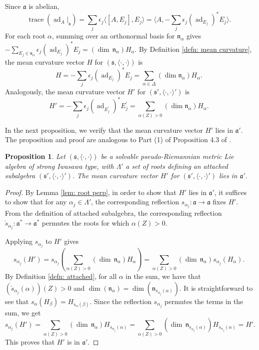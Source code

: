 \documentclass[12pt]{amsart}
\newcommand{\la}{\langle}
\newcommand{\ra}{\rangle}
\newcommand{\fraka}{\ensuremath{\mathfrak{a}} }
\newcommand{\frakn}{\ensuremath{\mathfrak{n}} }
\newcommand{\fraks}{\ensuremath{\mathfrak{s}} }
\renewcommand\a{{\mathfrak{a}}}
\newcommand\n{{\mathfrak{n}}}
\newcommand\s{{\mathfrak{s}}}
\newcommand\ip{{\langle\cdot {,} \cdot\rangle}}
\newcommand\tr{\operatorname{trace}}
\newcommand\ad{\operatorname{ad}}
\theoremstyle{plain}
\newtheorem{prop}[theorem]{Proposition}
\theoremstyle{definition}
\theoremstyle{remark}
\numberwithin{equation}{section}
\numberwithin{theorem}{section}
\begin{document}
Since $\a$ is abelian,
$$ \tr(\ad_A|_{\s}) = \sum_j\epsilon_j \la [A, E_j], E_j \ra   = \la A, -\sum_j  \epsilon_j (\ad_{E_j})^* E_j\ra .$$  
For each root $\alpha$, summing over an orthonormal basis  for 
$\frakn_\alpha$ gives $-\sum_{E_j \in \frakn_\alpha} \epsilon_j (\ad_{E_j})^* E_j  =  (\dim \,\n_\alpha) H_\alpha.$ By Definition \ref{defn: mean curvature},  the mean curvature vector $H$ for $(\fraks,\ip)$  is
\begin{equation}\label{eqn: H}
 H = -\sum_j \epsilon_j (\ad_{E_j})^\ast E_j
 = \sum_{\alpha\in\Delta} (\dim \n_\alpha) H_\alpha .
\end{equation}
Analogously, the  mean curvature vector $H'$ for $(\fraks',\ip')$ is 
\begin{equation}\label{eqn: H'}
 H' = -\sum_j \epsilon_j (\ad_{E_j^\prime})^\ast E_j^\prime
 = \sum_{\alpha(Z)>0} (\dim \n_\alpha) H_\alpha . \end{equation}
 
In the next proposition, we verify that  the mean curvature vector $H'$  
lies in $\fraka'$.  The proposition and proof are analogous to Part (1) of Proposition 
4.3 of \cite{tamaru-11}.
\begin{prop}\label{prop: mean curvature vectors}
Let $(\s,\ip)$ be a solvable pseudo-Riemannian  metric Lie algebra of strong Iwasawa type, with $\Lambda'$ a set of  roots defining an attached subalgebra   $(\s',\ip')$. 
The mean curvature vector $H'$ for $(\fraks',\ip')$ lies in $\a'$.
\end{prop}

\begin{proof}
By Lemma \ref{lem: root perp}, in order to show that $H'$ lies in $\a'$,  it suffices to show that for any  $\alpha_j \in \Lambda'$, the corresponding reflection   $s_{\alpha_j} : \a \to \a$  fixes $H'.$ 
From the definition of attached subalgebra,
the corresponding  reflection  $\check{s}_{\alpha_j} : \a^* \to \a^*$  permutes the roots for which $\alpha(Z) >0$.  

Applying $s_{\alpha_j}$ to $H'$ gives
\[ s_{\alpha_j}(H') = s_{\alpha_j} \left(\sum_{\alpha(Z)>0} (\dim\,\n_\alpha) H_\alpha \right) 
= \sum_{\alpha(Z) >0} (\dim\,\n_\alpha) s_{\alpha_j}(H_\alpha). \]
By  Definition \ref{defn: attached},  for all $\alpha$ in the sum, we have that $(\check{s}_{\alpha_j}(\alpha))(Z) >0$ and $\dim(\n_\alpha) = \dim(\n_{\check{s}_{\alpha_j}(\alpha)})$.  
It is straightforward to see that  $s_{\alpha}(H_\beta)=H_{\check{s}_\alpha(\beta)}$. Since the reflection $s_{\alpha_j}$ permutes the terms in the sum, we get 
$$s_{\alpha_j}(H') = \sum_{\alpha(Z)>0} (\dim\,\n_{\alpha}) H_{\check{s}_{\alpha_j}(\alpha)} = 
\sum_{\alpha(Z) >0} (\dim\,\n_{\check{s}_{\alpha_j}(\alpha)}) H_{\check{s}_{\alpha_j}(\alpha)} = H'.$$
This proves that  $H'$ is in $\a'$.  
\end{proof}
\end{document}
